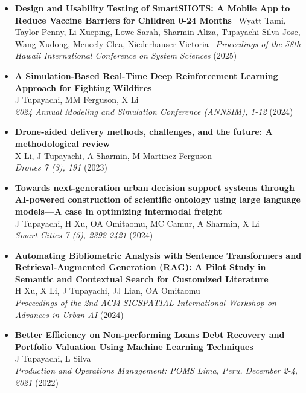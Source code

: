 \documentclass[10pt, letterpaper]{article}
\begin{document}
\begin{itemize}[left=0pt] %


    \item \textbf{Design and Usability Testing of SmartSHOTS: A Mobile App to Reduce Vaccine Barriers for Children 0-24 Months} \ Wyatt Tami, Taylor Penny, Li Xueping, Lowe Sarah, Sharmin Aliza, Tupayachi Silva Jose, Wang Xudong, Mcneely Clea, Niederhauser Victoria \ \textit{Proceedings of the 58th Hawaii International Conference on System Sciences} (2025) \


    \item \textbf{A Simulation-Based Real-Time Deep Reinforcement Learning Approach for Fighting Wildfires} \\
    J Tupayachi, MM Ferguson, X Li \\
    \textit{2024 Annual Modeling and Simulation Conference (ANNSIM), 1-12} (2024)\\
    
    \item \textbf{Drone-aided delivery methods, challenges, and the future: A methodological review} \\
    X Li, J Tupayachi, A Sharmin, M Martinez Ferguson \\
    \textit{Drones 7 (3), 191} (2023) \\

    \item \textbf{Towards next-generation urban decision support systems through AI-powered construction of scientific ontology using large language models—A case in optimizing intermodal freight} \\
    J Tupayachi, H Xu, OA Omitaomu, MC Camur, A Sharmin, X Li \\
    \textit{Smart Cities 7 (5), 2392-2421} (2024) \\

    \item \textbf{Automating Bibliometric Analysis with Sentence Transformers and Retrieval-Augmented Generation (RAG): A Pilot Study in Semantic and Contextual Search for Customized Literature} \\
    H Xu, X Li, J Tupayachi, JJ Lian, OA Omitaomu \\
    \textit{Proceedings of the 2nd ACM SIGSPATIAL International Workshop on Advances in Urban-AI} (2024) \\

    \item \textbf{Better Efficiency on Non-performing Loans Debt Recovery and Portfolio Valuation Using Machine Learning Techniques} \\
    J Tupayachi, L Silva \\
    \textit{Production and Operations Management: POMS Lima, Peru, December 2-4, 2021} (2022) \\



   

\end{itemize}
\end{document}
